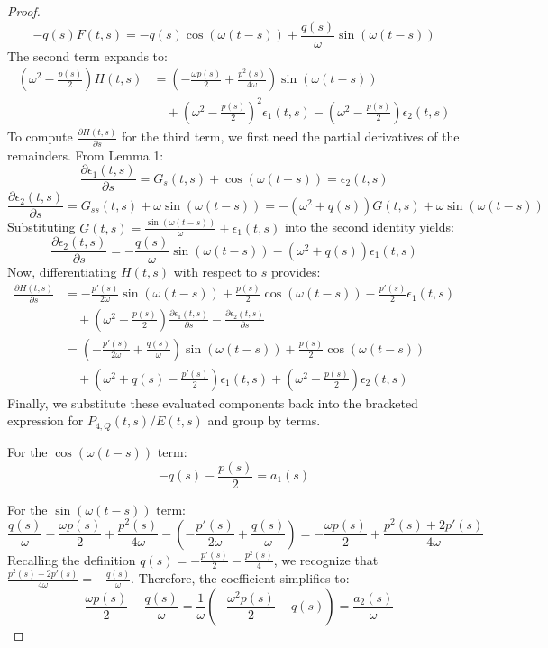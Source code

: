 \documentclass[10pt,reqno]{amsart}
\theoremstyle{definition}
\begin{document}
\begin{proof}
		\[ -q(s)F(t,s) = -q(s)\cos(\omega(t-s)) + \frac{q(s)}{\omega}\sin(\omega(t-s)) \]
		The second term expands to:
		\begin{align*}
			\left(\omega^2 - \frac{p(s)}{2}\right)H(t,s) &= \left( -\frac{\omega p(s)}{2} + \frac{p^2(s)}{4\omega} \right)\sin(\omega(t-s)) \\
			&\quad + \left(\omega^2 - \frac{p(s)}{2}\right)^2 \epsilon_1(t,s) - \left(\omega^2 - \frac{p(s)}{2}\right)\epsilon_2(t,s)
		\end{align*}
		To compute $\frac{\partial H(t,s)}{\partial s}$ for the third term, we first need the partial derivatives of the remainders. From Lemma 1:
		\[ \frac{\partial \epsilon_1(t,s)}{\partial s} = G_s(t,s) + \cos(\omega(t-s)) = \epsilon_2(t,s) \]
		\[ \frac{\partial \epsilon_2(t,s)}{\partial s} = G_{ss}(t,s) + \omega\sin(\omega(t-s)) = -(\omega^2+q(s))G(t,s) + \omega\sin(\omega(t-s)) \]
		Substituting $G(t,s) = \frac{\sin(\omega(t-s))}{\omega} + \epsilon_1(t,s)$ into the second identity yields:
		\[ \frac{\partial \epsilon_2(t,s)}{\partial s} = -\frac{q(s)}{\omega}\sin(\omega(t-s)) - (\omega^2+q(s))\epsilon_1(t,s) \]
		Now, differentiating $H(t,s)$ with respect to $s$ provides:
		\begin{align*}
			\frac{\partial H(t,s)}{\partial s} &= -\frac{p'(s)}{2\omega}\sin(\omega(t-s)) + \frac{p(s)}{2}\cos(\omega(t-s)) - \frac{p'(s)}{2}\epsilon_1(t,s) \\
			&\quad + \left(\omega^2 - \frac{p(s)}{2}\right)\frac{\partial \epsilon_1(t,s)}{\partial s} - \frac{\partial \epsilon_2(t,s)}{\partial s} \\
			&= \left( -\frac{p'(s)}{2\omega} + \frac{q(s)}{\omega} \right)\sin(\omega(t-s)) + \frac{p(s)}{2}\cos(\omega(t-s)) \\
			&\quad + \left( \omega^2 + q(s) - \frac{p'(s)}{2} \right)\epsilon_1(t,s) + \left(\omega^2 - \frac{p(s)}{2}\right)\epsilon_2(t,s)
		\end{align*}
		Finally, we substitute these evaluated components back into the bracketed expression for $P_{4,Q}(t,s) / E(t,s)$ and group by terms. 
		
		For the $\cos(\omega(t-s))$ term:
		\[ -q(s) - \frac{p(s)}{2} = a_1(s) \]
		
		For the $\sin(\omega(t-s))$ term:
		\[ \frac{q(s)}{\omega} - \frac{\omega p(s)}{2} + \frac{p^2(s)}{4\omega} - \left( -\frac{p'(s)}{2\omega} + \frac{q(s)}{\omega} \right) = - \frac{\omega p(s)}{2} + \frac{p^2(s) + 2p'(s)}{4\omega} \]
		Recalling the definition $q(s) = -\frac{p'(s)}{2} - \frac{p^2(s)}{4}$, we recognize that $\frac{p^2(s) + 2p'(s)}{4\omega} = -\frac{q(s)}{\omega}$. Therefore, the coefficient simplifies to:
		\[ -\frac{\omega p(s)}{2} - \frac{q(s)}{\omega} = \frac{1}{\omega} \left( -\frac{\omega^2 p(s)}{2} - q(s) \right) = \frac{a_2(s)}{\omega} \]
		

\end{proof}
\end{document}

